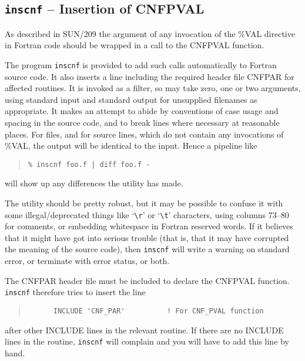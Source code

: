 \documentclass[twoside,11pt]{article}
\newcommand{\xref}[3]{#1}
\renewcommand{\_}{\texttt{\symbol{95}}}
\begin{document}
\subsection{{\tt inscnf} -- Insertion of CNF\_PVAL}

As described in \xref{SUN/209}{sun209}{pointers} the argument of
any invocation of the \%VAL directive in Fortran code 
should be wrapped in a call to 
the \xref{CNF\_PVAL}{sun209}{CNF\_PVAL} function.

The program {\tt inscnf} is provided to add such calls automatically
to Fortran source code.  
It also inserts a line including the required header file CNF\_PAR for
affected routines.  It is invoked as a filter, so may take zero,
one or two arguments, using standard input and standard output for 
unsupplied filenames as appropriate.  It makes an attempt to abide by
conventions of case usage and spacing in the source code, and to
break lines where necessary at reasonable places.  For files,
and for source lines, which do not contain any invocations of \%VAL, 
the output will be identical to the input.  Hence a pipeline like
\begin{quote}
\begin{verbatim}
% inscnf foo.f | diff foo.f - 
\end{verbatim}
\end{quote}
will show up any differences the utility has made.

The utility should be pretty robust, but it may be possible to
confuse it with some illegal/deprecated things like 
`\verb+\r+' or `\verb+\t+' 
characters, using columns 73--80 for comments, or embedding whitespace
in Fortran reserved words.
If it believes
that it might have got into serious trouble (that is, that it may
have corrupted the meaning of the source code), then {\tt inscnf}
will write a warning on standard error, or terminate with error
status, or both.

The CNF\_PAR header file must be included to declare the CNF\_PVAL
function.  {\tt inscnf} therefore tries to insert the line
\begin{quote}
\begin{verbatim}
      INCLUDE 'CNF_PAR'          ! For CNF_PVAL function
\end{verbatim}
\end{quote}
after  other INCLUDE lines in the relevant routine.  
If there are no INCLUDE lines in the routine, {\tt inscnf} will
complain and you will have to add this line by hand.
\end{document}
